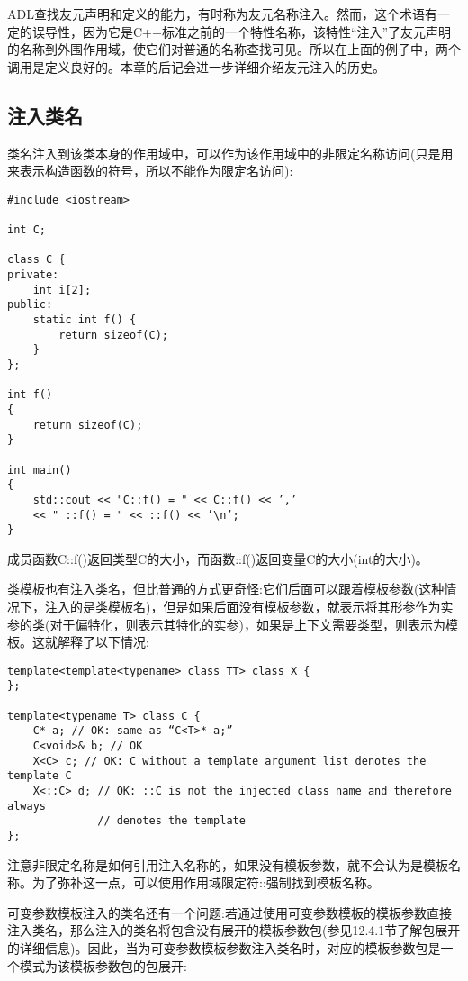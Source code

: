 ADL查找友元声明和定义的能力，有时称为友元名称注入。然而，这个术语有一定的误导性，因为它是C++标准之前的一个特性名称，该特性“注入”了友元声明的名称到外围作用域，使它们对普通的名称查找可见。所以在上面的例子中，两个调用是定义良好的。本章的后记会进一步详细介绍友元注入的历史。

\subsection{注入类名}

类名注入到该类本身的作用域中，可以作为该作用域中的非限定名称访问(只是用来表示构造函数的符号，所以不能作为限定名访问):

\begin{lstlisting}[style=styleCXX]
#include <iostream>

int C;

class C {
private:
	int i[2];
public:
	static int f() {
		return sizeof(C);
	}
};

int f()
{
	return sizeof(C);
}

int main()
{
	std::cout << "C::f() = " << C::f() << ’,’
	<< " ::f() = " << ::f() << ’\n’;
}
\end{lstlisting}

成员函数C::f()返回类型C的大小，而函数::f()返回变量C的大小(int的大小)。

类模板也有注入类名，但比普通的方式更奇怪:它们后面可以跟着模板参数(这种情况下，注入的是类模板名)，但是如果后面没有模板参数，就表示将其形参作为实参的类(对于偏特化，则表示其特化的实参)，如果是上下文需要类型，则表示为模板。这就解释了以下情况:

\begin{lstlisting}[style=styleCXX]
template<template<typename> class TT> class X {
};

template<typename T> class C {
	C* a; // OK: same as “C<T>* a;”
	C<void>& b; // OK
	X<C> c; // OK: C without a template argument list denotes the template C
	X<::C> d; // OK: ::C is not the injected class name and therefore always
			  // denotes the template
};
\end{lstlisting}

注意非限定名称是如何引用注入名称的，如果没有模板参数，就不会认为是模板名称。为了弥补这一点，可以使用作用域限定符::强制找到模板名称。

可变参数模板注入的类名还有一个问题:若通过使用可变参数模板的模板参数直接注入类名，那么注入的类名将包含没有展开的模板参数包(参见12.4.1节了解包展开的详细信息)。因此，当为可变参数模板参数注入类名时，对应的模板参数包是一个模式为该模板参数包的包展开:

